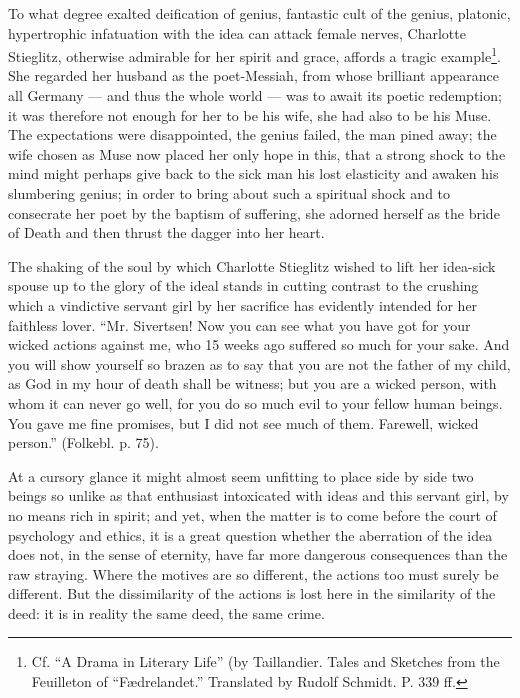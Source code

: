 \documentclass[12pt,a4paper,openany]{book}
\newcommand{\opage}[1]{\marginnote{\footnotesize\textit{[#1]}}}
\begin{document}
\setcounter{footnote}{0}%
\opage{695}To what degree exalted deification of genius, fantastic cult of the genius, platonic, hypertrophic infatuation with the idea can attack female nerves, Charlotte Stieglitz, otherwise admirable for her spirit and grace, affords a tragic example\footnote[1]{Cf. ``A Drama in Literary Life'' (by Taillandier. Tales and Sketches from the Feuilleton of ``Fædrelandet.'' Translated by Rudolf Schmidt. P. 339 ff.}. She regarded her husband as %
the poet-Messiah, from whose brilliant appearance all Germany --- and thus the whole world --- was to await its poetic redemption; it was therefore not enough for her to be his wife, she had also to be his Muse. The expectations were disappointed, the genius failed, the man pined away; the wife chosen as Muse now placed her only hope in this, that a strong shock to the mind might perhaps give back to the sick man his lost elasticity and awaken his slumbering genius; in order to bring about such a spiritual shock and to consecrate her poet by the baptism of suffering, she adorned herself as the bride of Death and then thrust the dagger into her heart.

The shaking of the soul by which Charlotte Stieglitz wished to lift her idea-sick spouse up to the glory of the ideal stands in cutting contrast to the crushing which a vindictive servant girl by her sacrifice has evidently intended for her faithless lover. ``Mr. Sivertsen! Now you can see what you have got for your wicked actions against me, who 15 weeks ago suffered so much for your sake. And you will show yourself so brazen as to say that you are not the father of my child, as God in my hour of death shall be witness; but you are a wicked person, with whom
\setcounter{footnote}{0}%
\opage{696}it can never go well, for you do so much evil to your fellow human beings. You gave me fine promises, but I did not see much of them. Farewell, wicked person.'' (Folkebl. p. 75).

At a cursory glance it might almost seem unfitting to place side by side two beings so unlike as that enthusiast intoxicated with ideas and this servant girl, by no means rich in spirit; and yet, when the matter is to come before the court of psychology and ethics, it is a great question whether the aberration of the idea does not, in the sense of eternity, have far more dangerous consequences than the raw straying. Where the motives are so different, the actions too must surely be different. But the dissimilarity of the actions is lost here in the similarity of the deed: it is in reality the same deed, the same crime.
\end{document}
